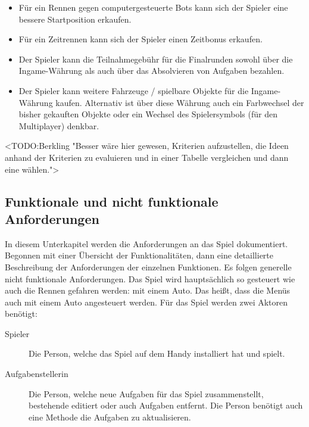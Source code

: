 \begin{enumerate}
		\begin{itemize}
			\item{Für ein Rennen gegen computergesteuerte Bots kann sich der Spieler eine bessere Startposition erkaufen.}
			\item{Für ein Zeitrennen kann sich der Spieler einen Zeitbonus erkaufen.}
			\item{Der Spieler kann die Teilnahmegebühr für die Finalrunden sowohl über die Ingame-Währung als auch über das Absolvieren von Aufgaben bezahlen.}
			\item{Der Spieler kann weitere Fahrzeuge / spielbare Objekte für die Ingame-Währung kaufen. Alternativ ist über diese Währung auch ein Farbwechsel der bisher gekauften Objekte oder ein Wechsel des Spielersymbols (für den Multiplayer) denkbar.}
		\end{itemize}
	\end{enumerate}
	<TODO:Berkling "Besser wäre hier gewesen, Kriterien aufzustellen, die Ideen anhand der Kriterien zu evaluieren und in einer Tabelle vergleichen und dann eine wählen.">

\subsection{Funktionale und nicht funktionale Anforderungen}\label{ssec:requirements}
	In diesem Unterkapitel werden die Anforderungen an das Spiel dokumentiert. Begonnen mit einer Übersicht der Funktionalitäten, dann eine detaillierte Beschreibung der Anforderungen der einzelnen Funktionen. Es folgen generelle nicht funktionale Anforderungen.
	Das Spiel wird hauptsächlich so gesteuert wie auch die Rennen gefahren werden: mit einem Auto. Das heißt, dass die Menüs auch mit einem Auto angesteuert werden.
	Für das Spiel werden zwei Aktoren benötigt:
	\begin{description}
		\item[Spieler]{ Die Person, welche das Spiel auf dem Handy installiert hat und spielt. }
		\item[Aufgabenstellerin]{ Die Person, welche neue Aufgaben für das Spiel zusammenstellt, bestehende editiert oder auch Aufgaben entfernt. Die Person benötigt auch eine Methode die Aufgaben zu aktualisieren. }
	\end{description}

